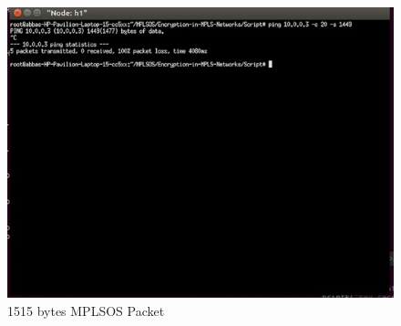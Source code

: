 \begin{figure}
       \centering\includegraphics[width=\textwidth]{Final/MPLS_Frag.jpg}
       \caption{1515 bytes MPLSOS Packet}
       \label{fig:compbest}
\end{figure}